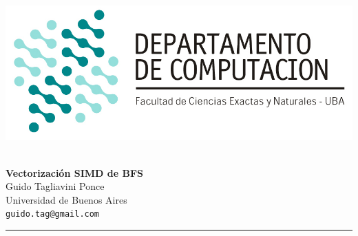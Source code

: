 \hfill \includegraphics[scale = 0.75]{imagenes/logo_dc.jpg}~\\[0.25cm]

\begin{center}
	\textbf{\Large Vectorización SIMD de BFS}\\[1cm]
	{\large Guido Tagliavini Ponce\\[0.15cm]}
	Universidad de Buenos Aires\\[0.15cm]
	\texttt{guido.tag@gmail.com}\\[1cm]
\end{center}
\rule{\linewidth}{0.2mm}

